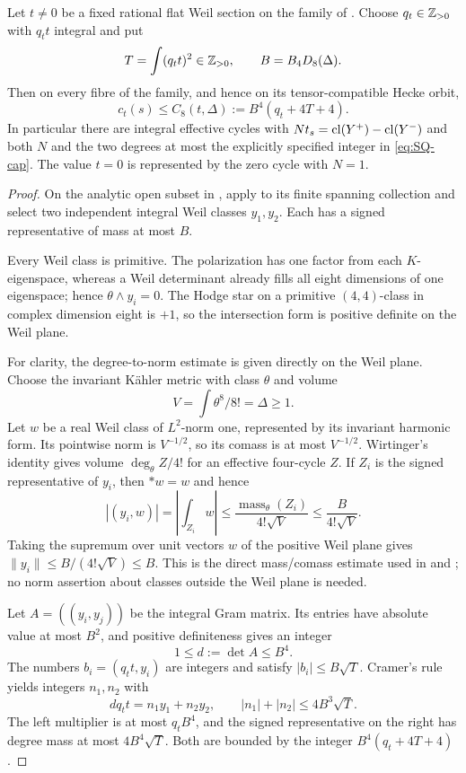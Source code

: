 \begin{theorem}\label{SQ9}
Let $t\ne0$ be a fixed rational flat Weil section on the family of . Choose $q_t\in\mathbb Z_{>0}$ with $q_tt$ integral and put
\[
 T=\int(q_tt)^2\in\mathbb Z_{>0},\qquad
 B=B_4D_8(\Delta).
\]
Then on every fibre of the family, and hence on its tensor-compatible Hecke orbit,
\begin{equation}\label{eq:SQ-cap}
 c_t(s)\le C_8(t,\Delta):=B^4(q_t+4T+4).
\end{equation}
In particular there are integral effective cycles with $Nt_s=\operatorname{cl}(Y^+)-\operatorname{cl}(Y^-)$ and both $N$ and the two degrees at most the explicitly specified integer in \eqref{eq:SQ-cap}. The value $t=0$ is represented by the zero cycle with $N=1$.
\end{theorem}
\begin{proof}
On the analytic open subset in , apply  to its finite spanning collection and select two independent integral Weil classes $y_1,y_2$. Each has a signed representative of mass at most $B$.

Every Weil class is primitive. The polarization has one factor from each $K$-eigenspace, whereas a Weil determinant already fills all eight dimensions of one eigenspace; hence $\theta\wedge y_i=0$. The Hodge star on a primitive $(4,4)$-class in complex dimension eight is $+1$, so the intersection form is positive definite on the Weil plane.

For clarity, the degree-to-norm estimate is given directly on the Weil plane. Choose the invariant K\"ahler metric with class $\theta$ and volume
\[
 V=\int\theta^8/8!=\Delta\ge1.
\]
Let $w$ be a real Weil class of $L^2$-norm one, represented by its invariant harmonic form. Its pointwise norm is $V^{-1/2}$, so its comass is at most $V^{-1/2}$. Wirtinger's identity gives volume $\deg_\theta Z/4!$ for an effective four-cycle $Z$. If $Z_i$ is the signed representative of $y_i$, then $*w=w$ and hence
\[
 |(y_i,w)|=\left|\int_{Z_i}w\right|
 \le\frac{\operatorname{mass}_\theta(Z_i)}{4!\sqrt V}
 \le\frac{B}{4!\sqrt V}.
\]
Taking the supremum over unit vectors $w$ of the positive Weil plane gives $\|y_i\|\le B/(4!\sqrt V)\le B$. This is the direct mass/comass estimate used in  and ; no norm assertion about classes outside the Weil plane is needed.

Let $A=((y_i,y_j))$ be the integral Gram matrix. Its entries have absolute value at most $B^2$, and positive definiteness gives an integer
\[
 1\le d:=\det A\le B^4.
\]
The numbers $b_i=(q_tt,y_i)$ are integers and satisfy $|b_i|\le B\sqrt T$. Cramer's rule yields integers $n_1,n_2$ with
\[
 d q_tt=n_1y_1+n_2y_2,
 \qquad |n_1|+|n_2|\le4B^3\sqrt T.
\]
The left multiplier is at most $q_tB^4$, and the signed representative on the right has degree mass at most $4B^4\sqrt T$. Both are bounded by the integer $B^4(q_t+4T+4)$.


\end{proof}
